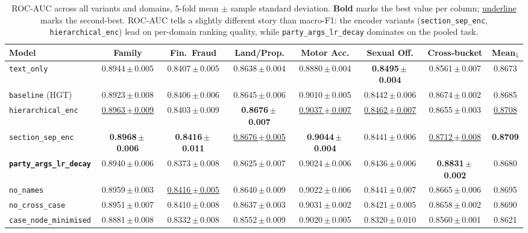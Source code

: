 \begin{table}[H]
  \centering
  \scriptsize
  \setlength{\tabcolsep}{3pt}
  \begin{adjustbox}{max width=\textwidth}
  \begin{tabular}{lccccccc}
    \toprule
    Model & Family & Fin.\ Fraud & Land/Prop. & Motor Acc. & Sexual Off. & Cross-bucket & Mean$_5$ \\
    \midrule
    \texttt{text\_only}                      & 0.8944\,$\pm$\,0.005 & 0.8407\,$\pm$\,0.005 & 0.8638\,$\pm$\,0.004 & 0.8880\,$\pm$\,0.004 & \textbf{0.8495\,$\pm$\,0.004} & 0.8561\,$\pm$\,0.007 & 0.8673 \\
    \texttt{baseline} (HGT)                  & 0.8923\,$\pm$\,0.008 & 0.8406\,$\pm$\,0.006 & 0.8645\,$\pm$\,0.006 & 0.9010\,$\pm$\,0.005 & 0.8442\,$\pm$\,0.006 & 0.8674\,$\pm$\,0.002 & 0.8685 \\
    \texttt{hierarchical\_enc}               & \underline{0.8963\,$\pm$\,0.009} & 0.8403\,$\pm$\,0.009 & \textbf{0.8676\,$\pm$\,0.007} & \underline{0.9037\,$\pm$\,0.007} & \underline{0.8462\,$\pm$\,0.007} & 0.8655\,$\pm$\,0.003 & \underline{0.8708} \\
    \texttt{section\_sep\_enc}               & \textbf{0.8968\,$\pm$\,0.006} & \textbf{0.8416\,$\pm$\,0.011} & \underline{0.8676\,$\pm$\,0.005} & \textbf{0.9044\,$\pm$\,0.004} & 0.8441\,$\pm$\,0.006 & \underline{0.8712\,$\pm$\,0.008} & \textbf{0.8709} \\
    \textbf{\texttt{party\_args\_lr\_decay}} & 0.8940\,$\pm$\,0.006 & 0.8373\,$\pm$\,0.008 & 0.8625\,$\pm$\,0.007 & 0.9024\,$\pm$\,0.006 & 0.8436\,$\pm$\,0.006 & \textbf{0.8831\,$\pm$\,0.002} & 0.8680 \\
    \texttt{no\_names}                       & 0.8959\,$\pm$\,0.003 & \underline{0.8416\,$\pm$\,0.005} & 0.8640\,$\pm$\,0.009 & 0.9022\,$\pm$\,0.006 & 0.8441\,$\pm$\,0.007 & 0.8665\,$\pm$\,0.006 & 0.8695 \\
    \texttt{no\_cross\_case}                 & 0.8951\,$\pm$\,0.007 & 0.8410\,$\pm$\,0.008 & 0.8637\,$\pm$\,0.003 & 0.9031\,$\pm$\,0.002 & 0.8421\,$\pm$\,0.005 & 0.8658\,$\pm$\,0.002 & 0.8690 \\
    \texttt{case\_node\_minimised}           & 0.8881\,$\pm$\,0.008 & 0.8332\,$\pm$\,0.008 & 0.8552\,$\pm$\,0.009 & 0.9020\,$\pm$\,0.005 & 0.8320\,$\pm$\,0.010 & 0.8560\,$\pm$\,0.001 & 0.8621 \\
    \bottomrule
  \end{tabular}
  \end{adjustbox}
  \caption{ROC-AUC across all variants and domains, 5-fold mean
  $\pm$ sample standard deviation. \textbf{Bold} marks the best
  value per column; \underline{underline} marks the second-best.
  ROC-AUC tells a slightly different story than macro-F1: the
  encoder variants (\texttt{section\_sep\_enc},
  \texttt{hierarchical\_enc}) lead on per-domain ranking quality,
  while \texttt{party\_args\_lr\_decay} dominates on the pooled
  task.}
  \label{tab:cross_bucket_rocauc}
\end{table}

